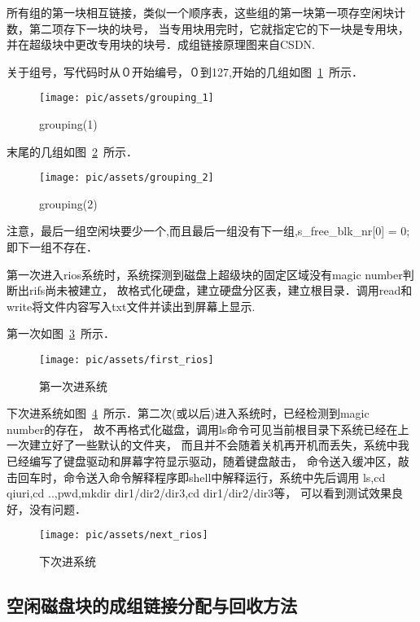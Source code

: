 所有组的第一块相互链接，类似一个顺序表，这些组的第一块第一项存空闲块计数，第二项存下一块的块号，
当专用块用完时，它就指定它的下一块是专用块，并在超级块中更改专用块的块号．成组链接原理图来自CSDN.

关于组号，写代码时从０开始编号，０到127,开始的几组如图~\ref{grouping_1}~所示．	

\begin{figure}[!htbp]
		\centering	\texttt{[image: pic/assets/grouping\_1]}
        \caption{grouping(1)}	\label{grouping_1}	\end{figure}
        
末尾的几组如图~\ref{grouping_2}~所示．	

\begin{figure}[!htbp]
		\centering	\texttt{[image: pic/assets/grouping\_2]}
		\caption{grouping(2)}	\label{grouping_2}	\end{figure}

注意，最后一组空闲块要少一个,而且最后一组没有下一组,s\_free\_blk\_nr[0] = 0;即下一组不存在．

第一次进入rios系统时，系统探测到磁盘上超级块的固定区域没有magic number判断出rifs尚未被建立，
故格式化硬盘，建立硬盘分区表，建立根目录．调用read和write将文件内容写入txt文件并读出到屏幕上显示.

第一次如图~\ref{first_rios}~所示．	

\begin{figure}[!htbp]
		\centering	\texttt{[image: pic/assets/first\_rios]}
		\caption{第一次进系统}	\label{first_rios}	\end{figure}

下次进系统如图~\ref{next_rios}~所示．第二次(或以后)进入系统时，已经检测到magic　number的存在，
故不再格式化磁盘，调用ls命令可见当前根目录下系统已经在上一次建立好了一些默认的文件夹，
而且并不会随着关机再开机而丢失，系统中我已经编写了键盘驱动和屏幕字符显示驱动，随着键盘敲击，
命令送入缓冲区，敲击回车时，命令送入命令解释程序即shell中解释运行，系统中先后调用
ls,cd qiuri,cd ..,pwd,mkdir dir1/dir2/dir3,cd dir1/dir2/dir3等，
可以看到测试效果良好，没有问题．	

\begin{figure}[!htbp]
		\centering	\texttt{[image: pic/assets/next\_rios]}
		\caption{下次进系统}	\label{next_rios}	\end{figure}


\subsection{空闲磁盘块的成组链接分配与回收方法}

